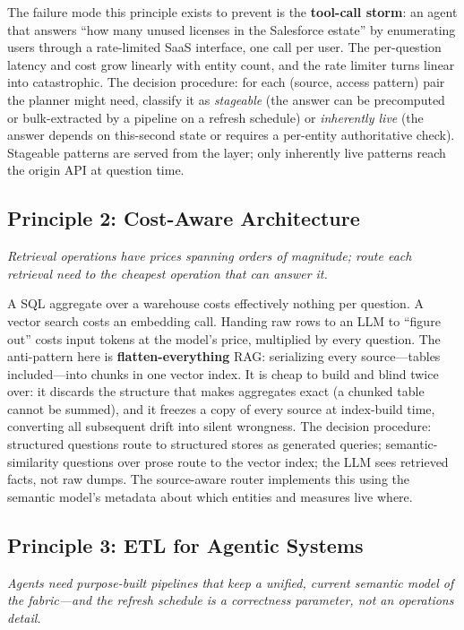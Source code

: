 \documentclass{ieeeaccess}
\begin{document}
The failure mode this principle exists to prevent is the \textbf{tool-call storm}:
an agent that answers ``how many unused licenses in the Salesforce estate'' by
enumerating users through a rate-limited SaaS interface, one call per user. The
per-question latency and cost grow linearly with entity count, and the rate limiter
turns linear into catastrophic. The decision procedure: for each (source, access
pattern) pair the planner might need, classify it as \emph{stageable} (the answer
can be precomputed or bulk-extracted by a pipeline on a refresh schedule) or
\emph{inherently live} (the answer depends on this-second state or requires a
per-entity authoritative check). Stageable patterns are served from the layer;
only inherently live patterns reach the origin API at question time.

\subsection{Principle 2: Cost-Aware Architecture}
\label{sec:p2}
\emph{Retrieval operations have prices spanning orders of magnitude; route each
retrieval need to the cheapest operation that can answer it.}

A SQL aggregate over a warehouse costs effectively nothing per question. A vector
search costs an embedding call. Handing raw rows to an LLM to ``figure out'' costs
input tokens at the model's price, multiplied by every question. The anti-pattern
here is \textbf{flatten-everything} RAG: serializing every source---tables
included---into chunks in one vector index. It is cheap to build and blind twice
over: it discards the structure that makes aggregates exact (a chunked table cannot
be summed), and it freezes a copy of every source at index-build time, converting
all subsequent drift into silent wrongness. The decision procedure: structured
questions route to structured stores as generated queries; semantic-similarity
questions over prose route to the vector index; the LLM sees retrieved facts, not
raw dumps. The source-aware router implements this using the semantic model's
metadata about which entities and measures live where.

\subsection{Principle 3: ETL for Agentic Systems}
\label{sec:p3}
\emph{Agents need purpose-built pipelines that keep a unified, current semantic
model of the fabric---and the refresh schedule is a correctness parameter, not an
operations detail.}
\label{sec:freshness}
\end{document}
